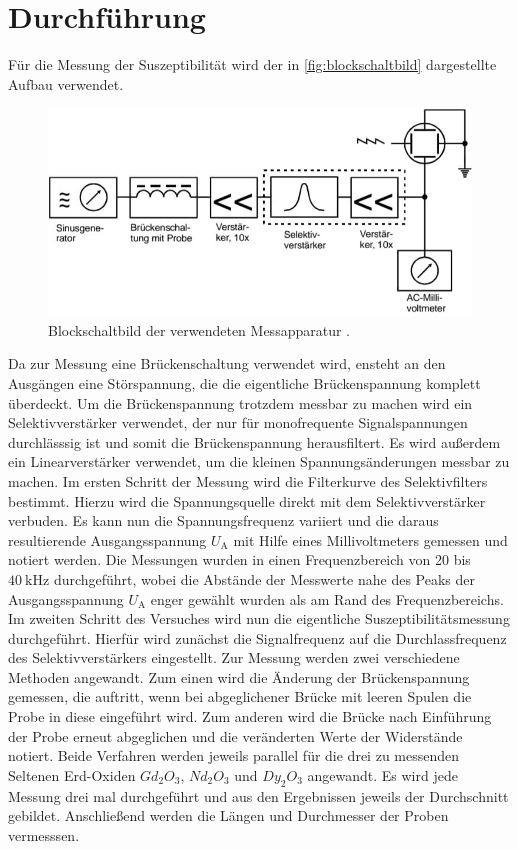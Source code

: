 \section{Durchführung}
\label{sec:Durchführung}
Für die Messung der Suszeptibilität wird der in \autoref{fig:blockschaltbild} dargestellte Aufbau verwendet.

\begin{figure}[H]
	\centering
	\includegraphics[width=0.6\linewidth]{data/blockschaltbild.jpeg}
	\caption{Blockschaltbild der verwendeten Messapparatur \cite{Anleitung606}.}
	\label{fig:blockschaltbild}
\end{figure}
\noindent
Da zur Messung eine Brückenschaltung verwendet wird, ensteht an den Ausgängen eine Störspannung, die die eigentliche Brückenspannung komplett überdeckt. Um die Brückenspannung
trotzdem messbar zu machen wird ein Selektivverstärker verwendet, der nur für monofrequente Signalspannungen durchlässsig ist und somit die Brückenspannung herausfiltert. Es wird 
außerdem ein Linearverstärker verwendet, um die kleinen Spannungsänderungen messbar zu machen.
\newline \newline
Im ersten Schritt der Messung wird die Filterkurve des Selektivfilters bestimmt. Hierzu wird die Spannungsquelle direkt mit dem Selektivverstärker verbuden. Es kann nun die Spannungsfrequenz
variiert und die daraus resultierende Ausgangsspannung $U_{\text{A}}$ mit Hilfe eines Millivoltmeters gemessen und notiert werden. Die Messungen wurden in einen Frequenzbereich von 20 bis
$\SI{40}{\kilo\hertz}$ durchgeführt, wobei die Abstände der Messwerte nahe des Peaks der Ausgangsspannung $U_{\text{A}}$ enger gewählt wurden als am Rand des Frequenzbereichs.
\newline \newline
Im zweiten Schritt des Versuches wird nun die eigentliche Suszeptibilitätsmessung durchgeführt. Hierfür wird zunächst die Signalfrequenz auf die Durchlassfrequenz des Selektivverstärkers
eingestellt. Zur Messung werden zwei verschiedene Methoden angewandt. Zum einen wird die Änderung der Brückenspannung gemessen, die auftritt, wenn bei abgeglichener Brücke mit leeren Spulen
die Probe in diese eingeführt wird. Zum anderen wird die Brücke nach Einführung der Probe erneut abgeglichen und die veränderten Werte der Widerstände notiert.
\newline
Beide Verfahren werden jeweils parallel für die drei zu messenden Seltenen Erd-Oxiden $Gd_2O_3$, $Nd_2O_3$ und $Dy_2O_3$ angewandt. Es wird jede Messung drei mal durchgeführt und aus den
Ergebnissen jeweils der Durchschnitt gebildet. Anschließend werden die Längen und Durchmesser der Proben vermesssen.